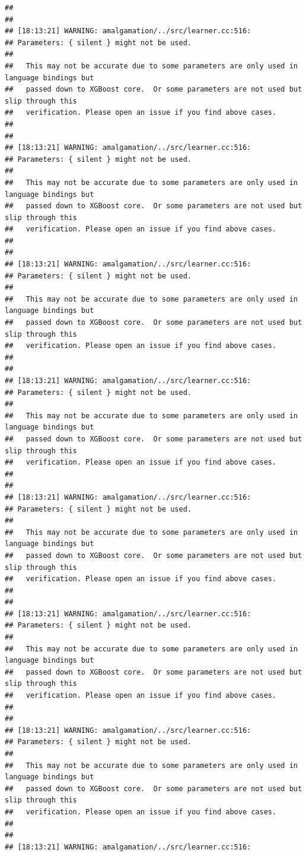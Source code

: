 \documentclass[AMS,STIX2COL]{WileyNJD-v2}\usepackage[]{graphicx}\usepackage[]{color}
\makeatletter
\newenvironment{kframe}{%
 \def\at@end@of@kframe{}%
 \ifinner\ifhmode%
  \def\at@end@of@kframe{\end{minipage}}%
  \begin{minipage}{\columnwidth}%
 \fi\fi%
 \def\FrameCommand##1{\hskip\@totalleftmargin \hskip-\fboxsep
 \colorbox{shadecolor}{##1}\hskip-\fboxsep
     \hskip-\linewidth \hskip-\@totalleftmargin \hskip\columnwidth}%
 \MakeFramed {\advance\hsize-\width
   \@totalleftmargin\z@ \linewidth\hsize
   \@setminipage}}%
 {\par\unskip\endMakeFramed%
 \at@end@of@kframe}
\newenvironment{knitrout}{}{} %
\makeatother
\begin{document}
\begin{knitrout}
\begin{kframe}
\begin{verbatim}
## 
## 
## [18:13:21] WARNING: amalgamation/../src/learner.cc:516: 
## Parameters: { silent } might not be used.
## 
##   This may not be accurate due to some parameters are only used in language bindings but
##   passed down to XGBoost core.  Or some parameters are not used but slip through this
##   verification. Please open an issue if you find above cases.
## 
## 
## [18:13:21] WARNING: amalgamation/../src/learner.cc:516: 
## Parameters: { silent } might not be used.
## 
##   This may not be accurate due to some parameters are only used in language bindings but
##   passed down to XGBoost core.  Or some parameters are not used but slip through this
##   verification. Please open an issue if you find above cases.
## 
## 
## [18:13:21] WARNING: amalgamation/../src/learner.cc:516: 
## Parameters: { silent } might not be used.
## 
##   This may not be accurate due to some parameters are only used in language bindings but
##   passed down to XGBoost core.  Or some parameters are not used but slip through this
##   verification. Please open an issue if you find above cases.
## 
## 
## [18:13:21] WARNING: amalgamation/../src/learner.cc:516: 
## Parameters: { silent } might not be used.
## 
##   This may not be accurate due to some parameters are only used in language bindings but
##   passed down to XGBoost core.  Or some parameters are not used but slip through this
##   verification. Please open an issue if you find above cases.
## 
## 
## [18:13:21] WARNING: amalgamation/../src/learner.cc:516: 
## Parameters: { silent } might not be used.
## 
##   This may not be accurate due to some parameters are only used in language bindings but
##   passed down to XGBoost core.  Or some parameters are not used but slip through this
##   verification. Please open an issue if you find above cases.
## 
## 
## [18:13:21] WARNING: amalgamation/../src/learner.cc:516: 
## Parameters: { silent } might not be used.
## 
##   This may not be accurate due to some parameters are only used in language bindings but
##   passed down to XGBoost core.  Or some parameters are not used but slip through this
##   verification. Please open an issue if you find above cases.
## 
## 
## [18:13:21] WARNING: amalgamation/../src/learner.cc:516: 
## Parameters: { silent } might not be used.
## 
##   This may not be accurate due to some parameters are only used in language bindings but
##   passed down to XGBoost core.  Or some parameters are not used but slip through this
##   verification. Please open an issue if you find above cases.
## 
## 
## [18:13:21] WARNING: amalgamation/../src/learner.cc:516: 

\end{verbatim}
\end{kframe}
\end{knitrout}
\end{document}
